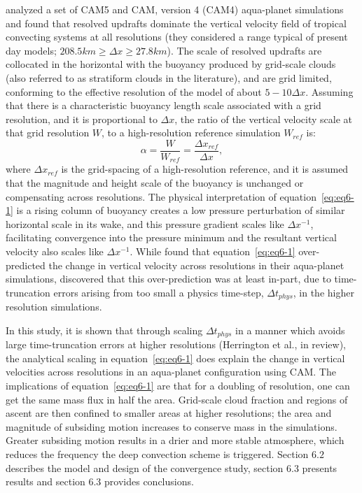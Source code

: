 \cite{HR2017JCLIM,HR2018JAMES} analyzed a set of CAM5 and CAM, version 4 (CAM4) aqua-planet simulations and found that resolved updrafts dominate the vertical velocity field of tropical convecting systems at all resolutions (they considered a range typical of present day models; $208.5 km \geq \Delta x \geq 27.8 km$). The scale of resolved updrafts are collocated in the horizontal with the buoyancy produced by grid-scale clouds (also referred to as stratiform clouds in the literature), and are grid limited, conforming to the effective resolution of the model of about $5-10\Delta x$. Assuming that there is a characteristic buoyancy length scale associated with a grid resolution, and it is proportional to $\Delta x$, the ratio of the vertical velocity scale at that grid resolution $W$, to a high-resolution reference simulation $W_{ref}$ is:
\begin{equation}
\alpha = \frac{W}{W_{ref}} = \frac{\Delta x_{ref}}{\Delta x} , \label{eq:eq6-1}
\end{equation}
where $\Delta x_{ref}$ is the grid-spacing of a high-resolution reference, and it is assumed that the magnitude and height scale of the buoyancy is unchanged or compensating across resolutions. The physical interpretation of equation~\ref{eq:eq6-1} is a rising column of buoyancy creates a low pressure perturbation of similar horizontal scale in its wake, and this pressure gradient scales like $\Delta x^{-1}$, facilitating convergence into the pressure minimum and the resultant vertical velocity also scales like $\Delta x^{-1}$. While \cite{HR2017JCLIM} found that equation~\ref{eq:eq6-1} over-predicted the change in vertical velocity across resolutions in their aqua-planet simulations, \cite{HR2017JCLIM} discovered that this over-prediction was at least in-part, due to time-truncation errors arising from too small a physics time-step, $\Delta t_{phys}$, in the higher resolution simulations.

In this study, it is shown that through scaling $\Delta t_{phys}$ in a manner which avoids large time-truncation errors at higher resolutions (Herrington et al., in review), the analytical scaling in equation~\ref{eq:eq6-1} does explain the change in vertical velocities across resolutions in an aqua-planet configuration using CAM. The implications of equation~\ref{eq:eq6-1} are that for a doubling of resolution, one can get the same mass flux in half the area. Grid-scale cloud fraction and regions of ascent are then confined to smaller areas at higher resolutions; the area and magnitude of subsiding motion increases to conserve mass in the simulations. Greater subsiding motion results in a drier and more stable atmosphere, which reduces the frequency the deep convection scheme is triggered. Section $6.2$ describes the model and design of the convergence study, section 6.3 presents results and section 6.3 provides conclusions.

